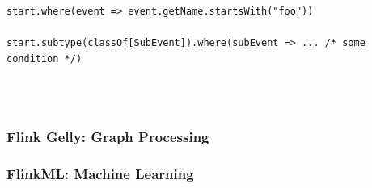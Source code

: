 \begin{code}
    \label{code:simple-cond}
    \begin{verbatim}
start.where(event => event.getName.startsWith("foo"))

start.subtype(classOf[SubEvent]).where(subEvent => ... /* some condition */)


    \end{verbatim}
\end{code}~\\

\subsubsection{Flink Gelly: Graph Processing}

\subsubsection{FlinkML: Machine Learning}


